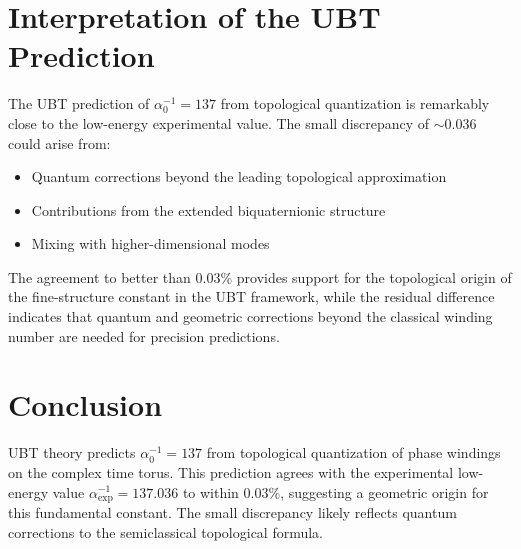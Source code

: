 \documentclass[12pt, a4paper]{article}
\begin{document}
\section{Interpretation of the UBT Prediction}

The UBT prediction of $\alpha_0^{-1} = 137$ from topological quantization is remarkably close to the low-energy experimental value. The small discrepancy of $\sim 0.036$ could arise from:
\begin{itemize}
\item Quantum corrections beyond the leading topological approximation
\item Contributions from the extended biquaternionic structure
\item Mixing with higher-dimensional modes
\end{itemize}

The agreement to better than $0.03\%$ provides support for the topological origin of the fine-structure constant in the UBT framework, while the residual difference indicates that quantum and geometric corrections beyond the classical winding number are needed for precision predictions.

\section{Conclusion}

UBT theory predicts $\alpha_0^{-1} = 137$ from topological quantization of phase windings on the complex time torus. This prediction agrees with the experimental low-energy value $\alpha_{\text{exp}}^{-1} = 137.036$ to within $0.03\%$, suggesting a geometric origin for this fundamental constant. The small discrepancy likely reflects quantum corrections to the semiclassical topological formula.
\end{document}
